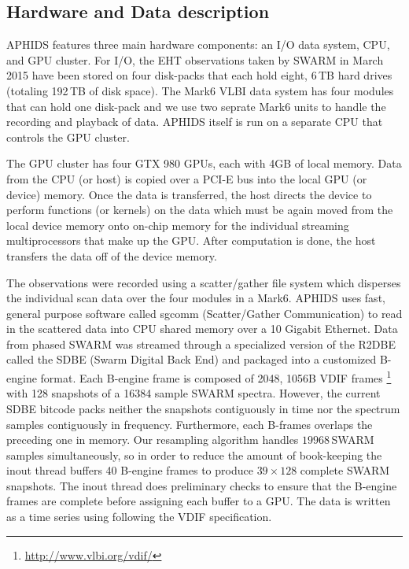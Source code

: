 \subsection{Hardware and Data description}

APHIDS features three main hardware components: an I/O data system, CPU, and GPU cluster.  For I/O, the 
EHT observations taken by SWARM in March 2015 have been stored on four disk-packs that each hold eight, 
6\,TB hard drives (totaling 192\,TB of disk space).  The Mark6 VLBI data system has four modules 
that can hold one disk-pack and we use
two seprate Mark6 units to handle the recording and playback of data.  APHIDS itself is run on a separate CPU 
that controls the GPU cluster.

The GPU cluster has four GTX 980 GPUs, each with 4GB of local memory.  Data from the CPU (or host) is copied over 
a PCI-E bus into the local GPU (or device) memory.  Once the data is transferred, the host directs the device
to perform functions (or kernels) on the data which must be again moved from the local device memory onto 
on-chip memory for the individual streaming multiprocessors that make up the GPU.  After computation is done, 
the host transfers the data off of the device memory.

The observations were recorded using a scatter/gather file system which disperses the 
individual scan data over the four modules in a Mark6.  APHIDS uses fast, general purpose software called 
sgcomm (Scatter/Gather Communication) to read in 
the scattered data into CPU shared memory over a 10 Gigabit Ethernet.  Data from phased SWARM was 
streamed through a specialized version of the R2DBE called the SDBE (Swarm Digital Back End) and packaged into
a customized B-engine format.  Each B-engine frame is composed of 2048, 1056B VDIF frames 
\footnote{\url{http://www.vlbi.org/vdif/}} with 128 snapshots of a 
16384 sample SWARM spectra.  However, the current SDBE bitcode packs
neither the snapshots contiguously in time nor the spectrum samples contiguously in frequency.  Furthermore, 
each B-frames overlaps the preceding one in memory.  Our resampling algorithm handles $19968$\,SWARM samples
simultaneously, so in order to reduce the amount of book-keeping the inout thread buffers 40 B-engine frames to 
produce $39 \times 128$ complete SWARM snapshots.  The inout thread does preliminary checks to ensure that the 
B-engine frames are complete before assigning each buffer to a GPU.  The data is written as a time series using 
following the VDIF specification.


